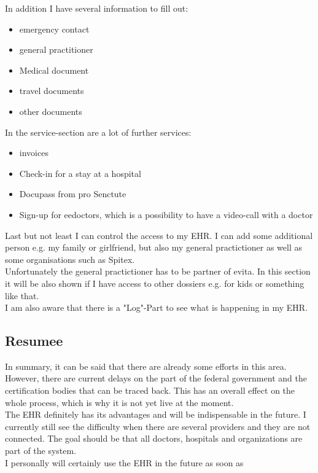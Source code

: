 \documentclass{report}
\begin{document}
In addition I have several information to fill out:
\begin{itemize}
   \item emergency contact
   \item general practitioner
   \item Medical document
   \item travel documents
   \item other documents
\end{itemize}

In the service-section are a lot of further services:
\begin{itemize}
   \item invoices
   \item Check-in for a stay at a hospital
   \item Docupass from pro Senctute
   \item Sign-up for eedoctors, which is a possibility to have a video-call with a doctor
\end{itemize}

Last but not least I can control the access to my EHR. I can add some additional person e.g. my family or girlfriend, but also my general practictioner as well as some organisations such as Spitex.\\
Unfortunately the general practictioner has to be partner of evita.
In this section it will be also shown if I have access to other dossiers e.g. for kids or something like that.\\
I am also aware that there is a "Log"-Part to see what is happening in my EHR.\\

\subsection*{Resumee}
In summary, it can be said that there are already some efforts in this area. However, there are current delays on the part of the federal government and the certification bodies that can be traced back. This has an overall effect on the whole process, which is why it is not yet live at the moment.\\
The EHR definitely has its advantages and will be indispensable in the future. I currently still see the difficulty when there are several providers and they are not connected. The goal should be that all doctors, hospitals and organizations are part of the system. \\
I personally will certainly use the EHR in the future as soon as 
\end{document}
